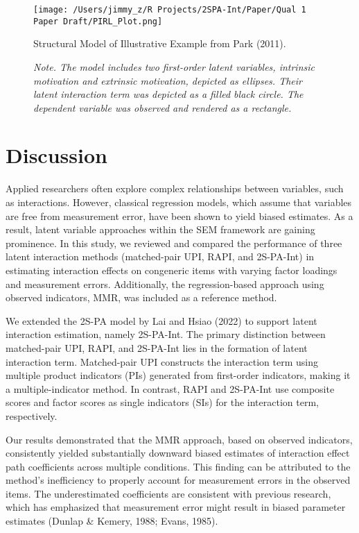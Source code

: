 \documentclass[
  man]{apa6}
\begin{document}
\begin{figure}[h]
\centering
\texttt{[image: /Users/jimmy\_z/R Projects/2SPA-Int/Paper/Qual 1 Paper Draft/PIRL\_Plot.png]}
\caption{Structural Model of Illustrative Example from Park (2011).}
\caption*{\textit{Note. The model includes two first-order latent variables, intrinsic motivation and extrinsic motivation, depicted as ellipses. Their latent interaction term was depicted as a filled black circle. The dependent variable was observed and rendered as a rectangle.}}
\end{figure}

\section{Discussion}\label{discussion}

Applied researchers often explore complex relationships between variables, such as interactions. However, classical regression models, which assume that variables are free from measurement error, have been shown to yield biased estimates. As a result, latent variable approaches within the SEM framework are gaining prominence. In this study, we reviewed and compared the performance of three latent interaction methods (matched-pair UPI, RAPI, and 2S-PA-Int) in estimating interaction effects on congeneric items with varying factor loadings and measurement errors. Additionally, the regression-based approach using observed indicators, MMR, was included as a reference method.

We extended the 2S-PA model by Lai and Hsiao (2022) to support latent interaction estimation, namely 2S-PA-Int. The primary distinction between matched-pair UPI, RAPI, and 2S-PA-Int lies in the formation of latent interaction term. Matched-pair UPI constructs the interaction term using multiple product indicators (PIs) generated from first-order indicators, making it a multiple-indicator method. In contrast, RAPI and 2S-PA-Int use composite scores and factor scores as single indicators (SIs) for the interaction term, respectively.

Our results demonstrated that the MMR approach, based on observed indicators, consistently yielded substantially downward biased estimates of interaction effect path coefficients across multiple conditions. This finding can be attributed to the method's inefficiency to properly account for measurement errors in the observed items. The underestimated coefficients are consistent with previous research, which has emphasized that measurement error might result in biased parameter estimates (Dunlap \& Kemery, 1988; Evans, 1985).
\end{document}
